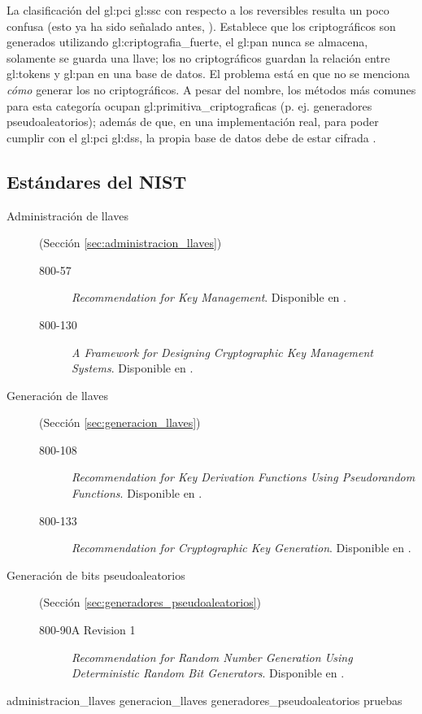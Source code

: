 
La clasificación del \gls{gl:pci} \gls{gl:ssc} con respecto a los reversibles
resulta un poco confusa (esto ya ha sido señalado antes, \cite{doc_sandra}).
Establece que los criptográficos son generados utilizando
\gls{gl:criptografia_fuerte}, el \gls{gl:pan} nunca se almacena, solamente se
guarda una llave; los no criptográficos guardan la relación entre
\glspl{gl:token} y \gls{gl:pan} en una base de datos. El problema está en que
no se menciona \textit{cómo} generar los no criptográficos. A pesar del nombre,
los métodos más comunes para esta categoría ocupan
\glspl{gl:primitiva_criptografica} (p. ej. generadores pseudoaleatorios); además
de que, en una implementación real, para poder cumplir con el \gls{gl:pci}
\gls{gl:dss}, la propia base de datos debe de estar cifrada \cite{pci_dss}.

\subsection{Estándares del NIST}

\begin{description}

  \item[Administración de llaves] (Sección \ref{sec:administracion_llaves})
    \begin{description}
      \item[800-57] \textit{Recommendation for Key Management}. Disponible en
        \cite{nist_llaves}.
      \item[800-130] \textit{A Framework for Designing Cryptographic Key
        Management Systems}. Disponible en \cite{nist_disenio_llaves}.
    \end{description}

  \item[Generación de llaves] (Sección \ref{sec:generacion_llaves})
    \begin{description}
      \item[800-108] \textit{Recommendation for Key Derivation Functions Using
        Pseudorandom Functions}. Disponible en \cite{nist_derivacion_llaves}.
      \item[800-133] \textit{Recommendation for Cryptographic Key Generation}.
        Disponible en \cite{nist_creacion_llaves}.
    \end{description}

  \item[Generación de bits pseudoaleatorios] (Sección
    \ref{sec:generadores_pseudoaleatorios})
    \begin{description}
      \item[800-90A Revision 1] \textit{Recommendation for Random Number Generation Using
        Deterministic Random Bit Generators}. Disponible en
        \cite{nist_aleatorios}.
    \end{description}
\end{description}

{administracion_llaves}
{generacion_llaves}
{generadores_pseudoaleatorios}
{pruebas}
